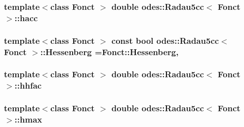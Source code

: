 \subsubsection[{hacc}]{\setlength{\rightskip}{0pt plus 5cm}template$<$class Fonct $>$ double {\bf odes\+::\+Radau5cc}$<$ Fonct $>$\+::hacc\hspace{0.3cm}{\ttfamily [private]}}\label{classodes_1_1Radau5cc_a868b61b5db9d458fd554f004ca366a52}
\hypertarget{classodes_1_1Radau5cc_ae66683695f55d21d7c11ca7e3323d0e9}{}
\subsubsection[{Hessenberg}]{\setlength{\rightskip}{0pt plus 5cm}template$<$class Fonct $>$ const bool {\bf odes\+::\+Radau5cc}$<$ Fonct $>$\+::Hessenberg =Fonct\+::\+Hessenberg\hspace{0.3cm}{\ttfamily [static]}, {\ttfamily [private]}}\label{classodes_1_1Radau5cc_ae66683695f55d21d7c11ca7e3323d0e9}
\hypertarget{classodes_1_1Radau5cc_ad853d1040e37757aad020edde3b2ec28}{}
\subsubsection[{hhfac}]{\setlength{\rightskip}{0pt plus 5cm}template$<$class Fonct $>$ double {\bf odes\+::\+Radau5cc}$<$ Fonct $>$\+::hhfac\hspace{0.3cm}{\ttfamily [private]}}\label{classodes_1_1Radau5cc_ad853d1040e37757aad020edde3b2ec28}
\hypertarget{classodes_1_1Radau5cc_a73d88dc2c07d7e200a1c03dae8caa7f4}{}
\subsubsection[{hmax}]{\setlength{\rightskip}{0pt plus 5cm}template$<$class Fonct $>$ double {\bf odes\+::\+Radau5cc}$<$ Fonct $>$\+::hmax\hspace{0.3cm}{\ttfamily [private]}}\label{classodes_1_1Radau5cc_a73d88dc2c07d7e200a1c03dae8caa7f4}
\hypertarget{classodes_1_1Radau5cc_aa3b6b73884b0a085cf7f2b701940658e}{}

